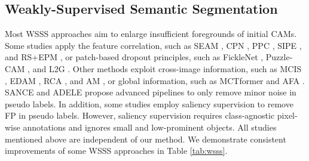 \documentclass[10pt,twocolumn,letterpaper]{article}
\begin{document}
\subsection{Weakly-Supervised Semantic Segmentation}\label{sec:wsss}















Most WSSS approaches \cite{zhang2020reliability, lee2021anti, li2021pseudo, kweon2021unlocking, su2021context, lee2021reducing, qin2022activation, xu2022multi, lee2022threshold} aim to enlarge insufficient foregrounds of initial CAMs. Some studies apply the feature correlation, such as SEAM \cite{wang2020self}, CPN \cite{zhang2021complementary}, PPC \cite{zhang2021complementary}, SIPE \cite{chen2022self}, and RS+EPM \cite{jo2022recurseed}, or patch-based dropout principles, such as FickleNet \cite{lee2019ficklenet}, Puzzle-CAM \cite{jo2021puzzle}, and L2G \cite{jiang2022l2g}. Other methods exploit cross-image information, such as MCIS \cite{sun2020mining}, EDAM \cite{wu2021embedded}, RCA \cite{zhou2022regional}, and AM \cite{xie2022c2am}, or global information, such as MCTformer \cite{xu2022multi} and AFA \cite{ru2022learning}. SANCE \cite{li2022towards} and ADELE \cite{liu2022adaptive} propose advanced pipelines to only remove minor noise in pseudo labels. In addition, some studies \cite{lee2021railroad, kim2021discriminative, du2022weakly} employ saliency supervision to remove FP in pseudo labels. However, saliency supervision requires class-agnostic pixel-wise annotations and ignores small and low-prominent objects. All studies mentioned above are independent of our method. We demonstrate consistent improvements of some WSSS approaches \cite{ahn2019weakly, wang2020self, lee2021anti, jo2022recurseed} in Table \ref{tab:wsss}.
\end{document}
